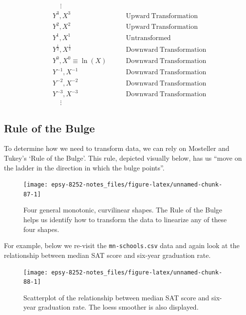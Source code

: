\documentclass[]{book}
\begin{document}
\[
\begin{split}
& ~~~~~\vdots \\
&Y^3,X^3 &\qquad \mathrm{Upward~Transformation}\\
&Y^2,X^2 &\qquad \mathrm{Upward~Transformation}\\
&Y^1,X^1  &\qquad \mathrm{Untransformed} \\
&Y^{\frac{1}{2}},X^{\frac{1}{2}} &\qquad \mathrm{Downward~Transformation}\\
&Y^0,X^0 \equiv \ln(X) &\qquad \mathrm{Downward~Transformation}\\
&Y^{-1},X^{-1} &\qquad \mathrm{Downward~Transformation}\\
&Y^{-2},X^{-2} &\qquad \mathrm{Downward~Transformation}\\
&Y^{-3},X^{-3} &\qquad \mathrm{Downward~Transformation} \\
& ~~~~~\vdots
\end{split}
\]

\hypertarget{rule-of-the-bulge}{%
\subsection*{Rule of the Bulge}\label{rule-of-the-bulge}}

To determine how we need to transform data, we can rely on Mosteller and Tukey's `Rule of the Bulge'. This rule, depicted visually below, has us ``move on the ladder in the direction in which the bulge points''.

\begin{figure}

{\centering \texttt{[image: epsy-8252-notes\_files/figure-latex/unnamed-chunk-87-1]} 

}

\caption{Four general monotonic, curvilinear shapes. The Rule of the Bulge helps us identify how to transform the data to linearize any of these four shapes.}\label{fig:unnamed-chunk-87}
\end{figure}

For example, below we re-visit the \texttt{mn-schools.csv} data and again look at the relationship between median SAT score and six-year graduation rate.

\begin{figure}

{\centering \texttt{[image: epsy-8252-notes\_files/figure-latex/unnamed-chunk-88-1]} 

}

\caption{Scatterplot of the relationship between median SAT score and six-year graduation rate. The loess smoother is also displayed.}\label{fig:unnamed-chunk-88}
\end{figure}
\end{document}
